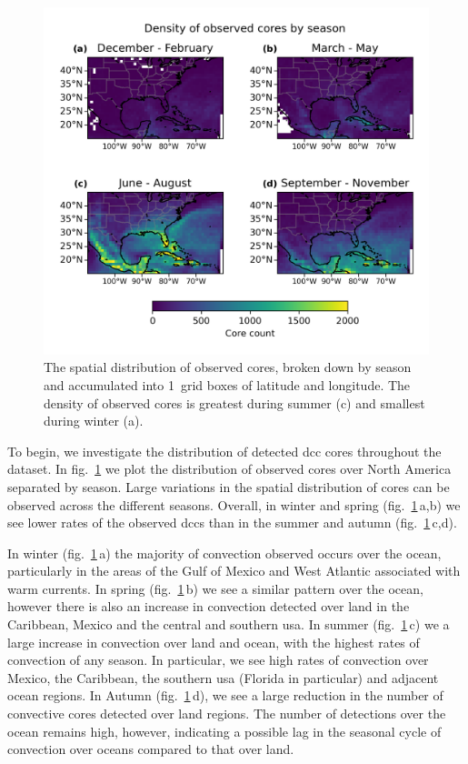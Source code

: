 \begin{figure}[tp]
    \centering
    \includegraphics[width=\textwidth]{figures/chapter2_03.png}
    \caption[
    The spatial distribution of observed cores by season
    ]{
    The spatial distribution of observed cores, broken down by season and accumulated into 1\textdegree\ grid boxes of latitude and longitude. The density of observed cores is greatest during summer (c) and smallest during winter (a).
    }
    \label{fig:core_density_by_season}
\end{figure}

To begin, we investigate the distribution of detected \acrshort{dcc} cores throughout the dataset.
In fig.~\ref{fig:core_density_by_season} we plot the distribution of observed cores over North America separated by season.
Large variations in the spatial distribution of cores can be observed across the different seasons.
Overall, in winter and spring (fig.~\ref{fig:core_density_by_season}\,a,b) we see lower rates of the observed \acrshort{dcc}s than in the summer and autumn (fig.~\ref{fig:core_density_by_season}\,c,d).

In winter (fig.~\ref{fig:core_density_by_season}\,a) the majority of convection observed occurs over the ocean, particularly in the areas of the Gulf of Mexico and West Atlantic associated with warm currents.
In spring (fig.~\ref{fig:core_density_by_season}\,b) we see a similar pattern over the ocean, however there is also an increase in convection detected over land in the Caribbean, Mexico and the central and southern \acrshort{usa}.
In summer (fig.~\ref{fig:core_density_by_season}\,c) we a large increase in convection over land and ocean, with the highest rates of convection of any season.
In particular, we see high rates of convection over Mexico, the Caribbean, the southern \acrshort{usa} (Florida in particular) and adjacent ocean regions.
In Autumn (fig.~\ref{fig:core_density_by_season}\,d), we see a large reduction in the number of convective cores detected over land regions.
The number of detections over the ocean remains high, however, indicating a possible lag in the seasonal cycle of convection over oceans compared to that over land.

